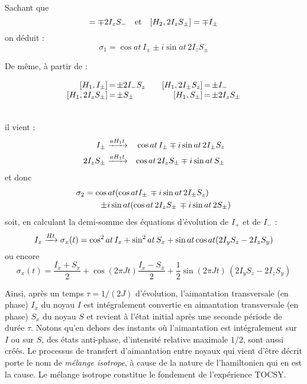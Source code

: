 Sachant que
\begin{equation}
[H_2, I_{\pm}] = \mp 2I_zS_- \qetq [H_2, 2I_zS_{\pm}] = \mp I_{\pm}
\end{equation}
on déduit :
\begin{equation}
\sigma_1 = \cos at \, I_{\pm} \pm i \sin at \, 2I_zS_{\pm}
\end{equation}

De même, à partir de :

\noindent\hfill
\parbox{6cm}{
\[
\begin{array}{r@{\,=\,}l@{\quad\quad}r@{\,=\,}l}
[H_1, I_{\pm}] & \pm2I_-S_z & [H_1, 2I_{\pm}S_z] & \pm I_- \\
{[H_1, 2I_zS_{\pm}]} & \pm S_{\pm} & [H_1, S_{\pm}] & \pm 2I_zS_{\pm}
\end{array}
\]
}
\hfill
\parbox{1cm}{
\begin{eqnarray}\end{eqnarray}
}

\noindent
il vient :
\begin{eqnarray}
I_{\pm} & \xrightarrow{a H_1 t} &
\cos at \, I_{\pm} \mp i \sin at \, 2I_{\pm}S_z \\
2I_zS_{\pm} & \xrightarrow{a H_1 t} &
\cos at \, 2I_zS_{\pm} \mp i \sin at \, S_{\pm}
\end{eqnarray}
et donc
\begin{eqnarray}
\lefteqn{\sigma_2 = \cos at (\cos at I_{\pm} \, \mp i \sin at \, 2I_{\pm}S_z)}
\nonumber\\
& & \quad\quad \pm i \sin at (\cos at \, 2I_zS_{\pm} \, \mp i \sin at \, 2S_{\pm})
\end{eqnarray}
soit, en calculant la demi-somme des équations d'évolution de $I_+$ et de $I_-$ :
\begin{equation}
I_x \xrightarrow{H t} \sigma_x(t) = \cos^2 at \, I_x + \sin^2 at \, S_x
+ \sin at \cos at (2I_yS_z - 2I_zS_y)
\end{equation}
ou encore
\begin{equation}
\label{eqn:isox}
\sigma_x(t) = \frac{I_x + S_x}{2}
+ \cos(2\pi J  t) \frac{I_x - S_x}{2} + \frac{1}{2} \sin(2\pi J t) \, (2I_yS_z - 2I_zS_y)
\end{equation}

Ainsi, après un temps $\tau=1/(2J)$ d'évolution, l'aimantation transversale (en phase)
$I_x$ du noyau $I$ est intégralement convertie en aimantation transversale (en phase) $S_x$ du
noyau $S$ et revient à l'état initial après une seconde période de durée $\tau$.
Notons qu'en dehors des instants où l'aimantation est intégralement sur
$I$ ou sur $S$, des états anti-phase, d'intensité relative maximale $1/2$, sont aussi créés.
Le processus de transfert d'aimantation entre noyaux qui vient d'être décrit porte
le nom de \emph{mélange isotrope}, à cause de la nature de l'hamiltonien
qui en est la cause.
Le mélange isotrope constitue le fondement de l'expérience TOCSY.


